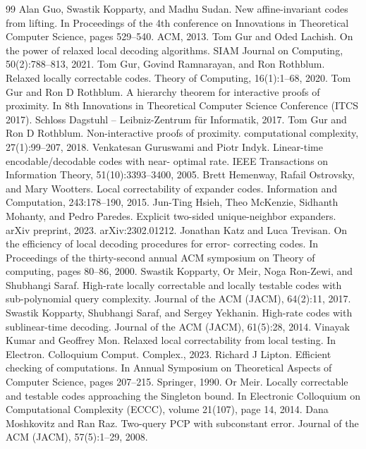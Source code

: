 \begin{thebibliography}{99}
 Alan Guo, Swastik Kopparty, and Madhu Sudan. New affine-invariant codes from lifting. In Proceedings of the 4th conference on Innovations in Theoretical Computer Science, pages 529–540. ACM, 2013.
 Tom Gur and Oded Lachish. On the power of relaxed local decoding algorithms. SIAM Journal on Computing, 50(2):788–813, 2021.
 Tom Gur, Govind Ramnarayan, and Ron Rothblum. Relaxed locally correctable codes. Theory of Computing, 16(1):1–68, 2020.
 Tom Gur and Ron D Rothblum. A hierarchy theorem for interactive proofs of proximity. In 8th Innovations in Theoretical Computer Science Conference (ITCS 2017). Schloss Dagstuhl – Leibniz-Zentrum für Informatik, 2017.
 Tom Gur and Ron D Rothblum. Non-interactive proofs of proximity. computational complexity, 27(1):99–207, 2018.
 Venkatesan Guruswami and Piotr Indyk. Linear-time encodable/decodable codes with near- optimal rate. IEEE Transactions on Information Theory, 51(10):3393–3400, 2005.
 Brett Hemenway, Rafail Ostrovsky, and Mary Wootters. Local correctability of expander codes. Information and Computation, 243:178–190, 2015.
 Jun-Ting Hsieh, Theo McKenzie, Sidhanth Mohanty, and Pedro Paredes. Explicit two-sided unique-neighbor expanders. arXiv preprint, 2023. arXiv:2302.01212.
 Jonathan Katz and Luca Trevisan. On the efficiency of local decoding procedures for error- correcting codes. In Proceedings of the thirty-second annual ACM symposium on Theory of computing, pages 80–86, 2000.
 Swastik Kopparty, Or Meir, Noga Ron-Zewi, and Shubhangi Saraf. High-rate locally correctable and locally testable codes with sub-polynomial query complexity. Journal of the ACM (JACM), 64(2):11, 2017.
 Swastik Kopparty, Shubhangi Saraf, and Sergey Yekhanin. High-rate codes with sublinear-time decoding. Journal of the ACM (JACM), 61(5):28, 2014.
 Vinayak Kumar and Geoffrey Mon. Relaxed local correctability from local testing. In Electron. Colloquium Comput. Complex., 2023.
 Richard J Lipton. Efficient checking of computations. In Annual Symposium on Theoretical Aspects of Computer Science, pages 207–215. Springer, 1990.
 Or Meir. Locally correctable and testable codes approaching the Singleton bound. In Electronic Colloquium on Computational Complexity (ECCC), volume 21(107), page 14, 2014.
 Dana Moshkovitz and Ran Raz. Two-query PCP with subconstant error. Journal of the ACM (JACM), 57(5):1–29, 2008.

\end{thebibliography}
